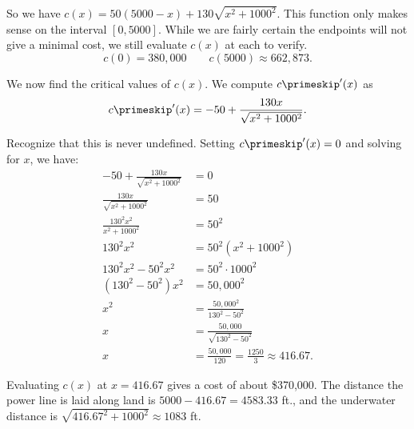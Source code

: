 {So we have $c(x) = 50(5000-x)+ 130\sqrt{x^2+1000^2}$. This function only makes sense on the interval $[0,5000]$. While we are fairly certain the endpoints will not give a minimal cost, we still evaluate $c(x)$ at each to verify.
\[c(0) = 380,000 \quad\quad c(5000) \approx 662,873.\]

We now find the critical values of $c(x)$. We compute $c\primeskip'(x)$ as 
\[c\primeskip'(x) = -50+\frac{130x}{\sqrt{x^2+1000^2}}.\]

Recognize that this is never undefined. Setting $c\primeskip'(x)=0$ and solving for $x$, we have:
\begin{align*}
-50+\frac{130x}{\sqrt{x^2+1000^2}} &= 0 \\
\frac{130x}{\sqrt{x^2+1000^2}}  &= 50\\
\frac{130^2x^2}{x^2+1000^2} &= 50^2\\
130^2x^2 &= 50^2(x^2+1000^2) \\
130^2x^2-50^2x^2 &= 50^2\cdot1000^2\\
(130^2-50^2)x^2 &= 50,000^2\\
x^2 &= \frac{50,000^2}{130^2-50^2}\\
x &= \frac{50,000}{\sqrt{130^2-50^2}}\\
x & = \frac{50,000}{120} =\frac{1250}{3} %
\approx 416.67.
\end{align*}

Evaluating $c(x)$ at $x=416.67$ gives a cost of about \$370,000. The distance the power line is laid along land is $5000-416.67 = 4583.33$ ft., and the underwater distance is $\sqrt{416.67^2+1000^2} \approx 1083$ ft.}

